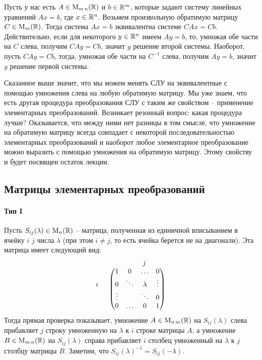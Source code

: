 Пусть у нас есть $A\in\operatorname{M}_{m\,n}(\mathbb R)$ и $b\in \mathbb R^{m}$, которые задают систему линейных уравнений $Ax = b$, где $x\in \mathbb R^{n}$.
Возьмем произвольную обратимую матрицу $C\in\operatorname{M}_{m}(\mathbb R)$.
Тогда система $Ax = b$ эквивалентна системе $CAx = Cb$.
Действительно, если для некоторого $y\in\mathbb R^{n}$ имеем $Ay = b$, то, умножая обе части на $C$ слева, получим $CAy = Cb$, значит $y$ решение второй системы.
Наоборот, пусть $CA y = Cb$, тогда, умножая обе части на $C^{-1}$ слева, получим $Ay =b$, значит $y$ решение первой системы.

Сказанное выше значит, что мы можем менять СЛУ на эквивалентные с помощью умножения слева на любую обратимую матрицу.
Мы уже знаем, что есть другая процедура преобразования СЛУ с таким же свойством -- применение элементарных преобразований.
Возникает резонный вопрос: какая процедура лучше?
Оказывается, что между ними нет разницы в том смысле, что умножение на обратимую матрицу всегда совпадает с некоторой последовательностью элементарных преобразований и наоборот любое элементарное преобразование можно выразить с помощью умножения на обратимую матрицу.
Этому свойству и будет посвящен остаток лекции.

\subsection{Матрицы элементарных преобразований}
\label{section::ElemMat}

\paragraph{Тип I}

Пусть $S_{ij}(\lambda)\in\operatorname{M}_{n}(\mathbb R)$ -- матрица, полученная из единичной вписыванием в ячейку $i$ $j$ числа $\lambda$ (при этом $i\neq j$, то есть ячейка берется не на диагонали).
Эта матрица имеет следующий вид:
\[
\begin{tabular}{cc}
{}&{\quad \quad $j$}\\
{
$
\begin{matrix}
{}\\{i}\\{}\\{}
\end{matrix}
$}&{
$
\begin{pmatrix}
{1}&{0}&{\ldots}&{0}\\
{0}&{\ddots}&{\lambda}&{\vdots}\\
{\vdots}&{}&{\ddots}&{0}\\
{0}&{\ldots}&{0}&{1}\\
\end{pmatrix}
$
}
\end{tabular}
\]
Тогда прямая проверка показывает, умножение $A\in\operatorname{M}_{n\,m}(\mathbb R)$ на $S_{ij}(\lambda)$ слева прибавляет $j$ строку умноженную на $\lambda$ к $i$ строке матрицы $A$, а умножение $B\in\operatorname{M}_{m\,n}(\mathbb R)$ на $S_{ij}(\lambda)$ справа прибавляет $i$ столбец умноженный на $\lambda$ к $j$ столбцу матрицы $B$.
Заметим, что $S_{ij}(\lambda)^{-1} = S_{ij}(-\lambda)$.

